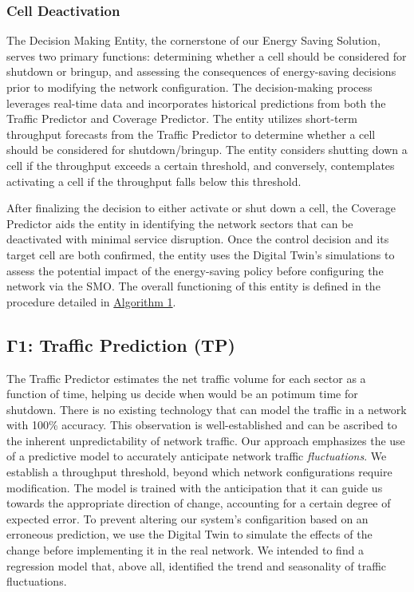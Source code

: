 \subsubsection{Cell Deactivation}

The Decision Making Entity, the cornerstone of our Energy Saving Solution, serves two primary functions: determining whether a cell should be considered for shutdown or bringup, and assessing the consequences of energy-saving decisions prior to modifying the network configuration. 
The decision-making process leverages real-time data and incorporates historical predictions from both the Traffic Predictor and Coverage Predictor.
The entity utilizes short-term throughput forecasts from the Traffic Predictor to determine whether a cell should be considered for shutdown/bringup.
The entity considers shutting down a cell if the throughput exceeds a certain threshold, and conversely, contemplates activating a cell if the throughput falls below this threshold.

After finalizing the decision to either activate or shut down a cell, the Coverage Predictor aids the entity in identifying the network sectors that can be deactivated with minimal service disruption. 
Once the control decision and its target cell are both confirmed, the entity uses the Digital Twin's simulations to assess the potential impact of the energy-saving policy before configuring the network via the SMO.
The overall functioning of this entity is defined in the procedure detailed in \hyperref[alg:energy_saving_algo]{Algorithm 1}.\\



\subsection{$\boldsymbol{\Gamma1}$: Traffic Prediction (TP)}
The Traffic Predictor estimates the net traffic volume for each sector as a function of time, helping us decide when would be an potimum  time for shutdown. 
There is no existing technology that can model the traffic in a network with 100\% accuracy. 
This observation is well-established and can be ascribed to the inherent unpredictability of network traffic.
Our approach emphasizes the use of a predictive model to accurately anticipate network traffic \textit{fluctuations}.
We establish a throughput threshold, beyond which network configurations require modification. 
The model is trained with the anticipation that it can guide us towards the appropriate direction of change, accounting for a certain degree of expected error.
To prevent altering our system's configarition based on an erroneous prediction, we use the Digital Twin to simulate the effects of the change before implementing it in the real network.  
We intended to find a regression model that, above all, identified the trend and seasonality of traffic fluctuations.

